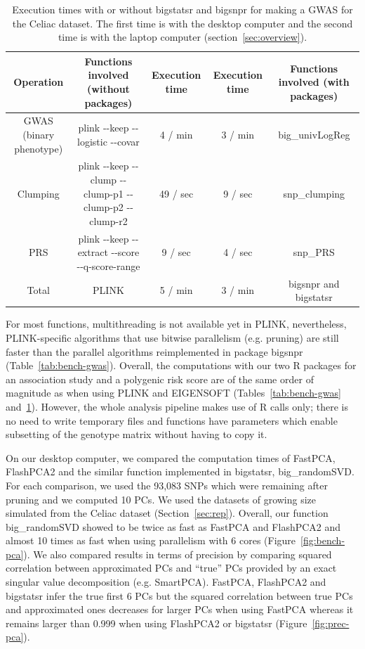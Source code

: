 \documentclass{bioinfo}
\begin{document}
\begin{table}[!tpb]
\centering
\begin{adjustbox}{max width=235pt}
\begin{tabular}{|c|cc|cc|}
\hline
Operation & Functions involved (without packages) & Execution time & Execution time & Functions involved (with packages) \\
\hline
GWAS (binary phenotype) & plink -{}-keep -{}-logistic -{}-covar & 4 / min & 3 / min & big\_univLogReg \\
Clumping & plink -{}-keep -{}-clump -{}-clump-p1
-{}-clump-p2 -{}-clump-r2 & 49 / sec & 9 / sec & snp\_clumping \\
PRS & plink -{}-keep -{}-extract -{}-score -{}-q-score-range & 9 / sec & 4 / sec & snp\_PRS \\
\hline
Total & PLINK & 5 / min & 3 / min & bigsnpr and bigstatsr \\
\hline
\end{tabular} 
\end{adjustbox}
\caption{Execution times with or without bigstatsr and bigsnpr for making a GWAS for the Celiac dataset. The first time is with the desktop computer and the second time is with the laptop computer (section~\ref{sec:overview}).} 
\label{tab:bench-prs}
\end{table}

For most functions, multithreading is not available yet in PLINK, nevertheless, PLINK-specific algorithms that use bitwise parallelism (e.g. pruning) are still faster than the parallel algorithms reimplemented in package bigsnpr (Table~\ref{tab:bench-gwas}). Overall, the computations with our two R packages for an association study and a polygenic risk score are of the same order of magnitude as when using PLINK and EIGENSOFT (Tables~\ref{tab:bench-gwas} and~\ref{tab:bench-prs}). However, the whole analysis pipeline makes use of R calls only; there is no need to write temporary files and functions have parameters which enable subsetting of the genotype matrix without having to copy it. 

On our desktop computer, we compared the computation times of FastPCA, FlashPCA2 and the similar function implemented in bigstatsr, big\_randomSVD. For each comparison, we used the 93,083 SNPs which were remaining after pruning and we computed 10 PCs. We used the datasets of growing size simulated from the Celiac dataset (Section~\ref{sec:rep}). Overall, our function big\_randomSVD showed to be twice as fast as FastPCA and FlashPCA2 and almost 10 times as fast when using parallelism with 6 cores (Figure~\ref{fig:bench-pca}). We also compared results in terms of precision by comparing squared correlation between approximated PCs and ``true'' PCs provided by an exact singular value decomposition (e.g. SmartPCA). FastPCA, FlashPCA2 and bigstatsr infer the true first 6 PCs but the squared correlation between true PCs and approximated ones decreases for larger PCs when using FastPCA whereas it remains larger than 0.999 when using FlashPCA2 or bigstatsr (Figure~\ref{fig:prec-pca}).   
\end{document}
